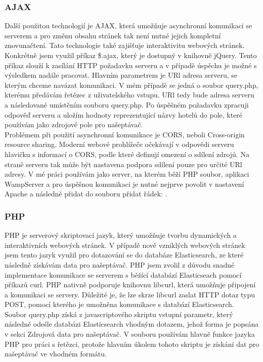 \documentclass[czech,BP]{thesiskiv}
\begin{document}
\subsubsection{AJAX}
Další použitou technologií je AJAX, která umožňuje asynchronní komunikaci se serverem a pro změnu obsahu stránek tak není nutné jejich kompletní znovunačtení. Tato technologie také zajišťuje interaktivitu webových stránek. Konkrétně jsem využil příkaz \$.ajax, který je dostupný v knihovně jQuery. Tento příkaz slouží k zasílání HTTP požadavku serveru a v případě úspěchu je možné s výsledkem nadále pracovat. Hlavním parametrem je URl adresa serveru, se kterým chceme navázat komunikaci. V mém případě se jedná o soubor query.php, kterému předávám řetězec z uživatelského vstupu. URl tedy bude adresa serveru a následované umístěním souboru query.php. Po úspěšném požadavku zpracuji odpověď serveru a uložím hodnoty reprezentující názvy hotelů do pole, které používám jako zdrojové pole pro našeptávač.
\\
Problémem při použití asynchronní komunikace je CORS, neboli Cross-origin resource sharing. Moderní webové prohlížeče očekávají v odpovědi serveru hlavičku s informací o CORS, podle které definují omezení o sdílení zdrojů. Na straně serveru tak může být nastavena podpora sdílení pouze pro určité URl adresy. V mé práci používám jako server, na kterém běží PHP soubor, aplikaci WampServer a pro úspěšnou komunikaci je nutné nejprve povolit v nastavení Apache  a následně přidat do souboru  přidat řádek: .
\subsubsection{PHP}
PHP je serverový skriptovací jazyk, který umožňuje tvorbu dynamických a interaktivních webových stránek.\cite{PHP} V případě nově vzniklých webových stránek jsem tento jazyk využil pro dotazování se do databáze Elasticsearch, ze které následně získávám data pro našeptávač. PHP jsem zvolil z důvodu snadné implementace komunikace se serverem s běžící databází Elasticseach pomocí příkazů curl. PHP nativně podporuje knihovnu libcurl, která umožňuje připojení a komunikaci se servery.\cite{PHP_libcurl} Důležité je, že lze skrze libcurl zaslat HTTP dotaz typu POST, pomocí kterého je umožněna komunikace s databází Elasticsearch.
\\
Soubor query.php získá z javascriptového skriptu vstupní parametr, který následně odešle databázi Elasticsearch vhodným dotazem, jehož forma je popsána v sekci Zdrojová data pro našeptávač. V souboru používám hlavně funkce jazyka PHP pro  práci s řetězci, protože hlavním úkolem tohoto skriptu je získání dat pro našeptávač ve vhodném formátu.
\end{document}

